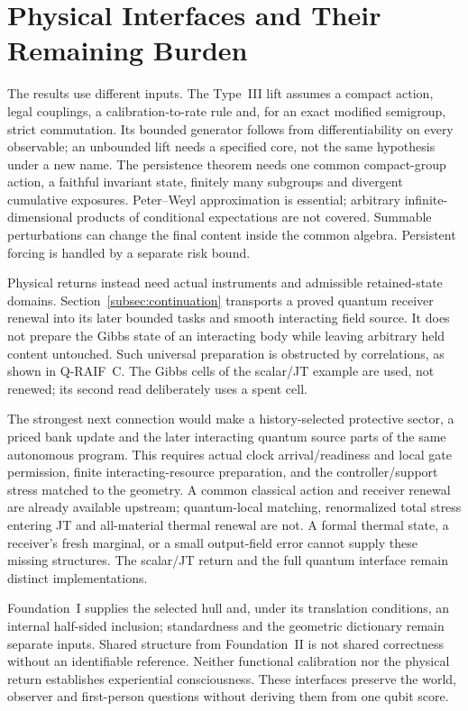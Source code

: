\documentclass[12pt]{article}
\theoremstyle{definition}
\theoremstyle{remark}
\begin{document}
\section{Physical Interfaces and Their Remaining Burden}\label{sec:ledger}

The results use different inputs. The Type~III lift assumes a compact
action, legal couplings, a calibration-to-rate rule and, for an exact
modified semigroup, strict commutation. Its bounded generator follows
from differentiability on every observable; an unbounded lift needs a
specified core, not the same hypothesis under a new name.
The persistence theorem needs one common compact-group action,
a faithful invariant state, finitely many subgroups and divergent
cumulative exposures. Peter--Weyl approximation is essential; arbitrary
infinite-dimensional products of conditional expectations are not
covered. Summable perturbations can change the final content inside the
common algebra. Persistent forcing is handled by a separate risk bound.

Physical returns instead need actual instruments and admissible
retained-state domains. Section~\ref{subsec:continuation} transports
a proved quantum receiver renewal into its later bounded tasks and
smooth interacting field source. It does not prepare the Gibbs state
of an interacting body while leaving arbitrary held content untouched.
Such universal preparation is obstructed by correlations, as shown in
Q-RAIF~C. The Gibbs cells of the scalar/JT example are used, not
renewed; its second read deliberately uses a spent cell.

The strongest next connection would make a history-selected protective
sector, a priced bank update and the later interacting quantum source
parts of the same autonomous program. This requires actual clock
arrival/readiness and local gate permission, finite interacting-resource
preparation, and the controller/support stress matched to the geometry.
A common classical action and receiver renewal are already available
upstream; quantum-local matching, renormalized total stress entering JT
and all-material thermal renewal are not. A formal thermal state, a
receiver's fresh marginal, or a small output-field error cannot supply
these missing structures. The scalar/JT return and the full quantum
interface remain distinct implementations.

Foundation~I supplies the selected hull and, under its translation
conditions, an internal half-sided inclusion; standardness and the
geometric dictionary remain separate inputs. Shared structure from
Foundation~II is not shared correctness without an identifiable
reference. Neither functional calibration nor the physical return
establishes experiential consciousness. These interfaces preserve the
world, observer and first-person questions without deriving them from
one qubit score.
\end{document}
